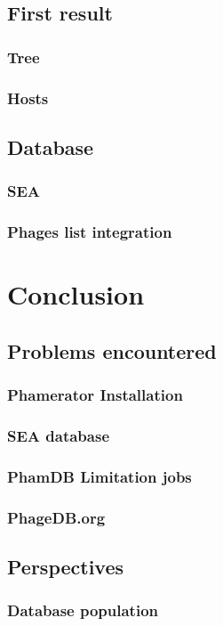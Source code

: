 \documentclass[a4paper,11pt]{report}
\begin{document}
\section{First result}
\subsection{Tree}
\subsection{Hosts}

\section{Database}
\subsection{SEA}
\subsection{Phages list integration}


\chapter{Conclusion}

\section{Problems encountered}
\subsection{Phamerator Installation}
\subsection{SEA database}
\subsection{PhamDB Limitation jobs}
\subsection{PhageDB.org}

\section{Perspectives}
\subsection{Database population}
\end{document}
